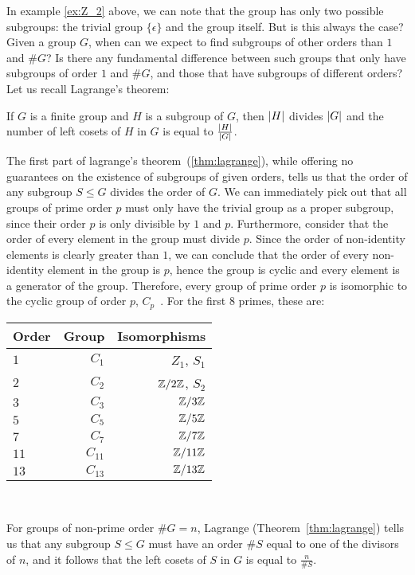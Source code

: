 In example \ref{ex:Z_2} above, we can note that the group has only two possible
subgroups: the trivial group $\{ \epsilon \}$ and the group itself.
But is this always the case?
Given a group $G$, when can we expect to find subgroups of other orders than $1$ and $\#G$?
Is there any fundamental difference between such groups that only have subgroups of order $1$ 
and $\#G$, and those that have subgroups of different orders?
Let us recall Lagrange's theorem:
\begin{theorem}[Lagrange]\label{thm:lagrange}
  If $G$ is a finite group and $H$ is a subgroup of $G$,
  then $\lvert H\rvert$ divides $\lvert G\rvert$ and the number of left cosets of $H$
  in $G$ is equal to $\frac{\lvert H\rvert}{\lvert G\rvert}$.~\cite[p.89, Theorem 8]{DummitFoote}
\end{theorem}
The first part of lagrange's theorem~(\ref{thm:lagrange}), while offering no guarantees on the existence of
subgroups of given orders, tells us that the order of any
subgroup $S \le G$ divides the order of $G$.
We can immediately pick out that all groups of prime order $p$ must only have the
trivial group as a proper subgroup, since their order $p$ is only divisible by $1$ and $p$.
Furthermore, consider that the order of every element in the group must divide $p$.
Since the order of non-identity elements is clearly greater than $1$, we can conclude
that the order of every non-identity element in the group is $p$, hence the group is cyclic
and every element is a generator of the group.
Therefore, every group of prime order $p$ is isomorphic to the cyclic group of order $p$,
$C_p$~\label{def:C_p}. For the first $8$ primes, these are:

\begin{center}
\begin{tabular}{ l r r }
  Order & Group & Isomorphisms \\
  \midrule
  $1$ & $C_1$ & $Z_1$, $S_1$ \\
  $2$ & $C_2$ & $\mathbb{Z}/2\mathbb{Z}$, $S_2$ \\
  $3$ & $C_3$ & $\mathbb{Z}/3\mathbb{Z}$ \\
  $5$ & $C_5$ & $\mathbb{Z}/5\mathbb{Z}$ \\
  $7$ & $C_7$ & $\mathbb{Z}/7\mathbb{Z}$ \\
  $11$ & $C_{11}$ & $\mathbb{Z}/11\mathbb{Z}$ \\
  $13$ & $C_{13}$ & $\mathbb{Z}/13\mathbb{Z}$ \\
\end{tabular}~\label{tab:prime-groups}
\end{center}

\bigskip
For groups of non-prime order $\#G = n$, Lagrange (Theorem~\ref{thm:lagrange}) tells
us that any subgroup $S \le G$ must have an order $\#S$ equal to one of the divisors of $n$,
and it follows that the left cosets of $S$ in $G$ is equal to $\frac{n}{\#S}$.

